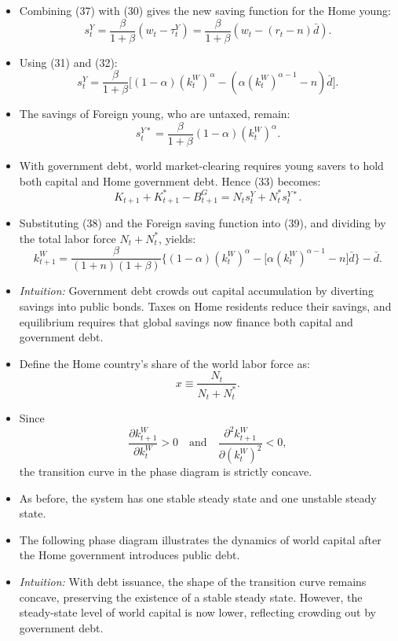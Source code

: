 \documentclass[12pt]{article}
\begin{document}
\begin{itemize}
  \item Combining (37) with (30) gives the new saving function for the Home young:
  \[
  s_t^Y = \frac{\beta}{1+\beta}(w_t - \tau_t^Y) 
  = \frac{\beta}{1+\beta}(w_t - (r_t - n)\bar{d}).
  \]

  \item Using (31) and (32):
  \[
  s_t^Y = \frac{\beta}{1+\beta}\Big[(1-\alpha)(k_t^W)^{\alpha} - (\alpha(k_t^W)^{\alpha-1} - n)\bar{d}\Big]. \tag{38}
  \]

  \item The savings of Foreign young, who are untaxed, remain:
  \[
  s_t^{Y*} = \frac{\beta}{1+\beta}(1-\alpha)(k_t^W)^{\alpha}.
  \]

  \item With government debt, world market-clearing requires young savers to hold both capital and Home government debt. Hence (33) becomes:
  \[
  K_{t+1} + K_{t+1}^* - B_{t+1}^G = N_t s_t^Y + N_t^* s_t^{Y*}. \tag{39}
  \]

  \item Substituting (38) and the Foreign saving function into (39), and dividing by the total labor force $N_t + N_t^*$, yields:
  \[
  k_{t+1}^W = \frac{\beta}{(1+n)(1+\beta)}\Big\{ (1-\alpha)(k_t^W)^{\alpha} - \big[\alpha(k_t^W)^{\alpha-1} - n\big]\bar{d} \Big\} - \bar{d}.
  \]

  \item \textit{Intuition:} Government debt crowds out capital accumulation by diverting savings into public bonds. Taxes on Home residents reduce their savings, and equilibrium requires that global savings now finance both capital and government debt.
\end{itemize}

\begin{itemize}
  \item Define the Home country’s share of the world labor force as:
  \[
  x \equiv \frac{N_t}{N_t + N_t^*}.
  \]

  \item Since 
  \[
  \frac{\partial k_{t+1}^W}{\partial k_t^W} > 0 
  \quad \text{and} \quad 
  \frac{\partial^2 k_{t+1}^W}{\partial (k_t^W)^2} < 0,
  \]
  the transition curve in the phase diagram is strictly concave.

  \item As before, the system has one stable steady state and one unstable steady state.

  \item The following phase diagram illustrates the dynamics of world capital after the Home government introduces public debt.

  \item \textit{Intuition:} With debt issuance, the shape of the transition curve remains concave, preserving the existence of a stable steady state. However, the steady-state level of world capital is now lower, reflecting crowding out by government debt.
\end{itemize}
\end{document}
